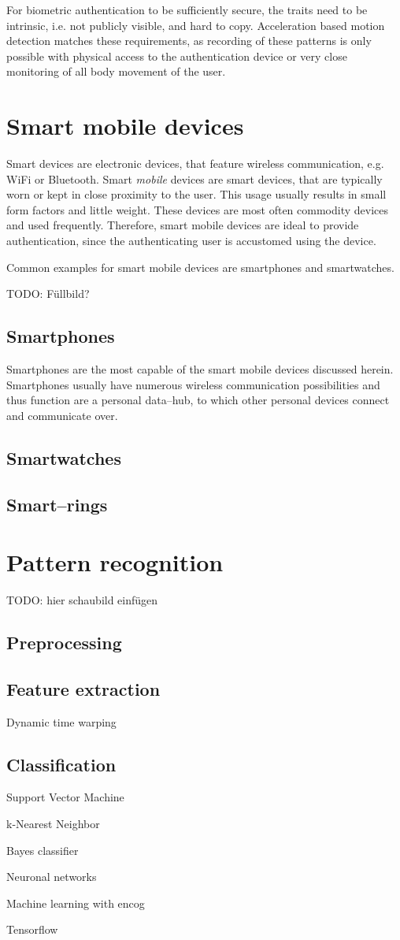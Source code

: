For biometric authentication to be sufficiently secure, the traits need to be intrinsic, i.e. not publicly visible, and hard to copy. Acceleration based motion detection matches these requirements, as recording of these patterns is only possible with physical access to the authentication device or very close monitoring of all body movement of the user.

\section{Smart mobile devices}
Smart devices are electronic devices, that feature wireless communication, e.g. WiFi or Bluetooth. Smart \emph{mobile} devices are smart devices, that are typically worn or kept in close proximity to the user. This usage usually results in small form factors and little weight. These devices are most often commodity devices and used frequently. Therefore, smart mobile devices are ideal to provide authentication, since the authenticating user is accustomed using the device.

Common examples for smart mobile devices are smartphones and smartwatches.

TODO: Füllbild?

\subsection{Smartphones}
Smartphones are the most capable of the smart mobile devices discussed herein. Smartphones usually have numerous wireless communication possibilities and thus function are a personal data--hub, to which other personal devices connect and communicate over. 
\subsection{Smartwatches}
\subsection{Smart--rings}
\section{Pattern recognition}
TODO: hier schaubild einfügen
\subsection{Preprocessing}
\subsection{Feature extraction}
Dynamic time warping
\subsection{Classification}
Support Vector Machine

k-Nearest Neighbor

Bayes classifier

Neuronal networks

Machine learning with encog

Tensorflow